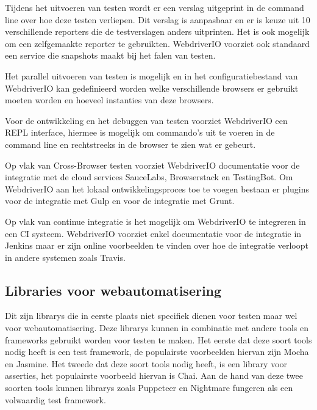 Tijdens het uitvoeren van testen wordt er een verslag uitgeprint in de command line  over hoe deze testen verliepen. Dit verslag is aanpasbaar en er is keuze uit 10 verschillende reporters die de testverslagen anders uitprinten. Het is ook mogelijk om een zelfgemaakte reporter te gebruikten. WebdriverIO voorziet ook standaard een service die \glspl{snapshot} maakt bij het falen van testen.

Het parallel uitvoeren van testen is mogelijk en in het configuratiebestand van WebdriverIO kan gedefinieerd worden welke verschillende browsers er gebruikt moeten worden en hoeveel instanties van deze browsers.

Voor de ontwikkeling en het debuggen van testen voorziet WebdriverIO een \gls{REPL} interface, hiermee is mogelijk om commando's uit te voeren in de command line en rechtstreeks in de browser te zien wat er gebeurt.

Op vlak van Cross-Browser testen voorziet WebdriverIO documentatie voor de integratie met de cloud services SauceLabs, Browserstack en TestingBot. Om WebdriverIO aan het lokaal ontwikkelingsproces toe te voegen bestaan er plugins voor de integratie met \gls{Gulp} en voor de integratie met \gls{Grunt}.

Op vlak van continue integratie is het mogelijk om WebdriverIO te integreren in een \gls{CI} systeem. WebdriverIO voorziet enkel documentatie voor de integratie in Jenkins maar er zijn online voorbeelden te vinden over hoe de integratie verloopt in andere systemen zoals Travis.

\subsection{Libraries voor webautomatisering}

Dit zijn \glspl{library} die in eerste plaats niet specifiek dienen voor testen maar wel voor webautomatisering. Deze \glspl{library} kunnen in combinatie met andere \glspl{tool} en \glspl{framework} gebruikt worden voor testen te maken. Het eerste dat deze soort \glspl{tool} nodig heeft is een test \gls{framework}, de populairste voorbeelden hiervan zijn Mocha en Jasmine. Het tweede dat deze soort \glspl{tool} nodig heeft, is een \gls{library} voor \glspl{assertie}, het populairste voorbeeld hiervan is Chai. Aan de hand van deze twee soorten \glspl{tool} kunnen \glspl{library} zoals Puppeteer en Nightmare fungeren als een volwaardig test \gls{framework}.

